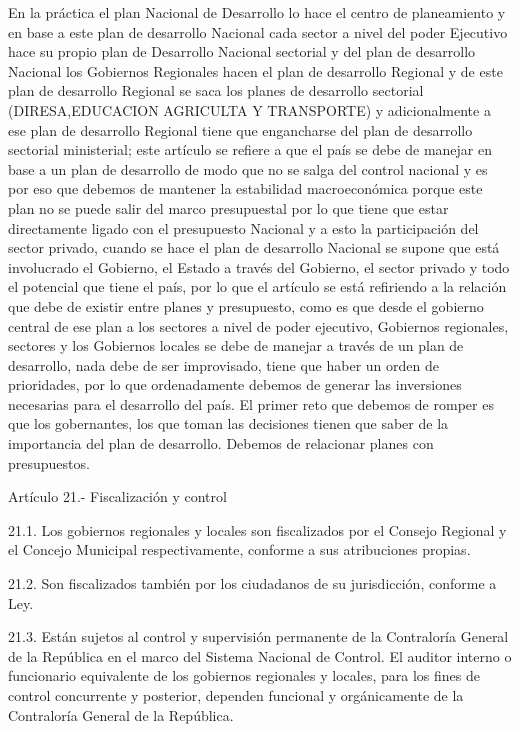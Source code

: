 \documentclass[
  a4paper,
]{article}
\begin{document}
En la práctica el plan Nacional de Desarrollo lo hace el centro de
planeamiento y en base a este plan de desarrollo Nacional cada sector a
nivel del poder Ejecutivo hace su propio plan de Desarrollo Nacional
sectorial y del plan de desarrollo Nacional los Gobiernos Regionales
hacen el plan de desarrollo Regional y de este plan de desarrollo
Regional se saca los planes de desarrollo sectorial (DIRESA,EDUCACION
AGRICULTA Y TRANSPORTE) y adicionalmente a ese plan de desarrollo
Regional tiene que engancharse del plan de desarrollo sectorial
ministerial; este artículo se refiere a que el país se debe de manejar
en base a un plan de desarrollo de modo que no se salga del control
nacional y es por eso que debemos de mantener la estabilidad
macroeconómica porque este plan no se puede salir del marco presupuestal
por lo que tiene que estar directamente ligado con el presupuesto
Nacional y a esto la participación del sector privado, cuando se hace el
plan de desarrollo Nacional se supone que está involucrado el Gobierno,
el Estado a través del Gobierno, el sector privado y todo el potencial
que tiene el país, por lo que el artículo se está refiriendo a la
relación que debe de existir entre planes y presupuesto, como es que
desde el gobierno central de ese plan a los sectores a nivel de poder
ejecutivo, Gobiernos regionales, sectores y los Gobiernos locales se
debe de manejar a través de un plan de desarrollo, nada debe de ser
improvisado, tiene que haber un orden de prioridades, por lo que
ordenadamente debemos de generar las inversiones necesarias para el
desarrollo del país. El primer reto que debemos de romper es que los
gobernantes, los que toman las decisiones tienen que saber de la
importancia del plan de desarrollo. Debemos de relacionar planes con
presupuestos.

Artículo 21.- Fiscalización y control

21.1. Los gobiernos regionales y locales son fiscalizados por el Consejo
Regional y el Concejo Municipal respectivamente, conforme a sus
atribuciones propias.

21.2. Son fiscalizados también por los ciudadanos de su jurisdicción,
conforme a Ley.

21.3. Están sujetos al control y supervisión permanente de la
Contraloría General de la República en el marco del Sistema Nacional de
Control. El auditor interno o funcionario equivalente de los gobiernos
regionales y locales, para los fines de control concurrente y posterior,
dependen funcional y orgánicamente de la Contraloría General de la
República.
\end{document}
